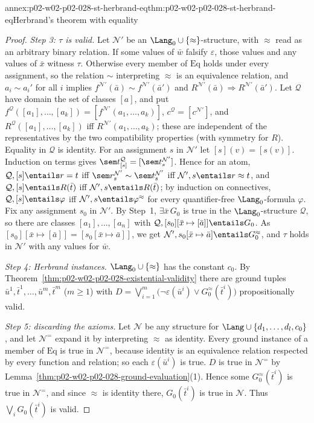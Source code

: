\begin{annexitem}{annex:p02-w02-p02-028-st-herbrand-eq}{thm:p02-w02-p02-028-st-herbrand-eq}{Herbrand's theorem with equality}
\begin{proof}
\emph{Step 3: \(\tau\) is valid.}  Let \(\mathcal N'\) be an
\(\Lang_0\cup\{\approx\}\)-structure, with \(\approx\) read as an arbitrary
binary relation.  If some values of \(\bar w\) falsify \(\varepsilon\), those
values and any values of \(\bar x\) witness \(\tau\).  Otherwise every member
of \(\mathrm{Eq}\) holds under every assignment, so the relation
\(\sim\) interpreting \(\approx\) is an equivalence relation, and
\(a_i\sim a_i'\) for all \(i\) implies
\(f^{\mathcal N'}(\bar a)\sim f^{\mathcal N'}(\bar a')\) and
\(R^{\mathcal N'}(\bar a)\Rightarrow R^{\mathcal N'}(\bar a')\).  Let
\(\mathcal Q\) have domain the set of classes \([a]\), and put
\(f^{\mathcal Q}([a_1],\ldots,[a_k])=[f^{\mathcal N'}(a_1,\ldots,a_k)]\),
\(c^{\mathcal Q}=[c^{\mathcal N'}]\), and
\(R^{\mathcal Q}([a_1],\ldots,[a_k])\) iff \(R^{\mathcal N'}(a_1,\ldots,a_k)\);
these are independent of the representatives by the two compatibility
properties (with symmetry for \(R\)).  Equality in \(\mathcal Q\) is identity.
For an assignment \(s\) in \(\mathcal N'\) let \([s](v)=[s(v)]\).  Induction
on terms gives \(\sem t^{\mathcal Q}_{[s]}=[\sem t^{\mathcal N'}_s]\).  Hence
for an atom, \(\mathcal Q,[s]\entails r=t\) iff
\(\sem r^{\mathcal N'}_s\sim\sem t^{\mathcal N'}_s\) iff
\(\mathcal N',s\entails r\approx t\), and \(\mathcal Q,[s]\entails R(\bar t)\)
iff \(\mathcal N',s\entails R(\bar t)\); by induction on connectives,
\(\mathcal Q,[s]\entails\varphi\) iff \(\mathcal N',s\entails\varphi^{\approx}\)
for every quantifier-free \(\Lang_0\)-formula \(\varphi\).  Fix any
assignment \(s_0\) in \(\mathcal N'\).  By Step~1, \(\exists\bar x\,G_0\) is
true in the \(\Lang_0\)-structure \(\mathcal Q\), so there are classes
\([a_1],\ldots,[a_n]\) with
\(\mathcal Q,[s_0][\bar x\mapsto[\bar a]]\entails G_0\).  As
\([s_0][\bar x\mapsto[\bar a]]=[s_0[\bar x\mapsto\bar a]]\), we get
\(\mathcal N',s_0[\bar x\mapsto\bar a]\entails G_0^{\approx}\), and \(\tau\)
holds in \(\mathcal N'\) with any values for \(\bar w\).

\emph{Step 4: Herbrand instances.}  \(\Lang_0\cup\{\approx\}\) has the
constant \(c_0\).  By Theorem~\ref{thm:p02-w02-p02-028-existential-validity}
there are ground tuples \(\bar u^1,\bar t^1,\ldots,\bar u^m,\bar t^m\)
(\(m\geq1\)) with
\(D=\bigvee_{i=1}^m\bigl(\neg\varepsilon(\bar u^i)\lor G_0^{\approx}(\bar t^i)\bigr)\)
propositionally valid.

\emph{Step 5: discarding the axioms.}  Let \(\mathcal N\) be any structure for
\(\Lang\cup\{d_1,\ldots,d_l,c_0\}\), and let \(\mathcal N^{=}\) expand it by
interpreting \(\approx\) as identity.  Every ground instance of a member of
\(\mathrm{Eq}\) is true in \(\mathcal N^{=}\), because identity is an
equivalence relation respected by every function and relation; so each
\(\varepsilon(\bar u^i)\) is true.  \(D\) is true in \(\mathcal N^{=}\) by
Lemma~\ref{thm:p02-w02-p02-028-ground-evaluation}(1).  Hence some
\(G_0^{\approx}(\bar t^i)\) is true in \(\mathcal N^{=}\), and since \(\approx\)
is identity there, \(G_0(\bar t^i)\) is true in \(\mathcal N\).  Thus
\(\bigvee_iG_0(\bar t^i)\) is valid.


\end{proof}
\end{annexitem}
